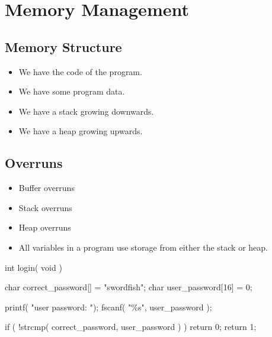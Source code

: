 \documentclass{beamer}
\begin{document}
%


\section{Memory Management}

\subsection{Memory Structure}

\begin{frame}{\insertsubsectionhead}
  \begin{itemize}
    \item We have the code of the program.
    \item We have some program data.
    \item We have a stack growing downwards.
    \item We have a heap growing upwards.
  \end{itemize}
\end{frame}

\subsection{Overruns}

\begin{frame}{\insertsubsectionhead}
  \begin{itemize}
    \item Buffer overruns
    \item Stack overruns
    \item Heap overruns
    \item All variables in a program use storage from either the stack or heap.
  \end{itemize}
\end{frame}

\begin{frame}[fragile]{\insertsubsectionhead}
  \begin{src}[language=C]
int
login( void )
{
  char correct_password[] = "swordfish";
  char user_password[16] = {0};

  printf( "user password: ");
  fscanf( "\%s", user_password );

  if ( !strcmp( correct_password, user_password ) )
    return 0;
  return 1;
}
  \end{src}
\end{frame}
\end{document}
